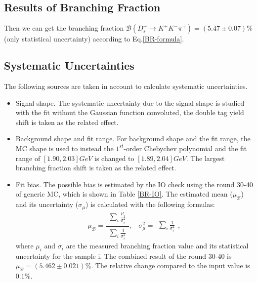 {    \subsection{Results of Branching Fraction}



    Then we can get the branching fraction $\mathcal{B}(D_{s}^{+} \rightarrow K^{+}K^{-}\pi^{+})=(5.47\pm0.07)\%$(only statistical uncertainty) according to Eq.\ref{BR-formula}.

    \subsection{Systematic Uncertainties}
    The following sources are taken in account to calculate systematic uncertainties.

    \begin{itemize}
        \item Signal shape. The systematic uncertainty due to the signal shape is studied with the fit without the Gaussian function convoluted, the double tag yield shift is taken as the related effect. 

        \item Background shape and fit range. For background shape and the fit range, the MC shape is used to instead the $1^{st}$-order Chebychev polynomial and the fit range of $[1.90, 2.03]GeV$ is changed to $[1.89, 2.04]GeV$. 
            The largest branching fraction shift is taken as the related effect.
        
        \item Fit bias. The possible bias is estimated by the IO check using the round 30-40 of generic MC, which is shown in Table \ref{BR-IO}. 
            The estimated mean ($\mu_{\mathcal{B}}$) and its uncertainty ($\sigma_{\mu}$) is calculated with the following formulas:
            \begin{equation}
            \mu_{\mathcal{B}} = \frac{\begin{matrix}\sum_{i}\frac{\mu_{i}}{\sigma_{i}^{2}}\end{matrix}}{\begin{matrix}\sum_{i}\frac{1}{\sigma_{i}^{2}}\end{matrix}}, \ \ \ \ \sigma_{\mu}^{2}=\begin{matrix}\sum_{i}\frac{1}{\sigma_{i}^{2}}\end{matrix},
            \label{BR-Combined}
            \end{equation}
            where $\mu_{i}$ and $\sigma_{i}$ are the measured branching fraction value and its statistical uncertainty for the sample i. The combined result of the round 30-40 is $\mu_{\mathcal{B}} = (5.462 \pm 0.021)\%$. 
            The relative change compared to the input value is $0.1\%$.


\end{itemize}}
